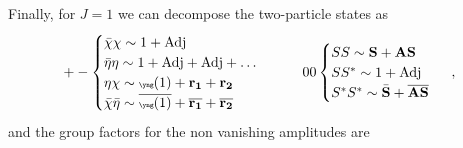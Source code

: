 \documentclass[a4paper,11pt]{article}
\newcommand{\be}{\begin{equation}}
\newcommand{\ee}{\end{equation}}
\newcommand{\nn}{\nonumber}
\begin{document}
Finally, for $J=1$ we can decompose the two-particle states as
 \be
+-
\begin{cases}
\bar\chi \chi \sim 1+ {\rm Adj} \nn \\
\bar\eta \eta \sim 1 + {\rm Adj} + {\rm Adj} + \dots \nn \\
\eta \chi   \sim  {\tiny{\yng(1)}} + {\bf r_{1}} + {\bf r_{2}}\nn \\
\bar\chi \bar\eta   \sim  {\overline{{\tiny{\yng(1)}}}}  + {\overline{{\bf r_{1}}}} + {\overline{{\bf r_{2}}}}\\
\end{cases}
\qquad
00
\begin{cases}
S S \sim {\bf S}+ {\bf AS} \nn \\
S S^* \sim 1+{\rm Adj} \nn \\
S^* S^* \sim {\bar{\bf S}}+\overline{{\bf AS}}
\end{cases} \ ,
\ee
and the group factors for the non vanishing amplitudes are
\end{document}
